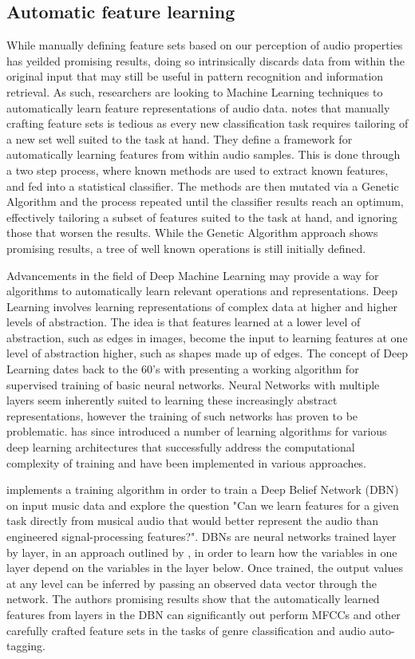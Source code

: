 \documentclass[twoside]{article}
\begin{document}
\begin{multicols}{2}
\section{Automatic feature learning}
While manually defining feature sets based on our perception of audio properties has yeilded promising results, doing so intrinsically discards data from within the original input that may still be useful in pattern recognition and information retrieval. As such, researchers are looking to Machine Learning techniques to automatically learn feature representations of audio data.  \citet{mierswa2005automatic} notes that manually crafting feature sets is tedious as every new classification task requires tailoring of a new set well suited to the task at hand. They define a framework for automatically learning features from within audio samples. This is done through a two step process, where known methods are used to extract known features, and fed into a statistical classifier. The methods are then mutated via a Genetic Algorithm and the process repeated until the classifier results reach an optimum, effectively tailoring a subset of features suited to the task at hand, and ignoring those that worsen the results. While the Genetic Algorithm approach shows promising results, a tree of well known operations is still initially defined.

Advancements in the field of Deep Machine Learning may provide a way for algorithms to automatically learn relevant operations and representations. Deep Learning involves learning representations of complex data at higher and higher levels of abstraction. The idea is that features learned at a lower level of abstraction, such as edges in images, become the input to learning features at one level of abstraction higher, such as shapes made up of edges. The concept of Deep Learning dates back to the 60's with \citet{ivakhnenko1965cybernetic} presenting a working algorithm for supervised training of basic neural networks. Neural Networks with multiple layers seem inherently suited to learning these increasingly abstract representations, however the training of such networks has proven to be problematic. \citet{bengio2009learning} has since introduced a number of learning algorithms for various deep learning architectures that successfully address the computational complexity of training and have been implemented in various approaches.

\citet{hamel2010learning} implements a training algorithm in order to train a Deep Belief Network (DBN) on input music data and explore the question "Can we learn features for a given task directly from musical audio that would better represent the audio than engineered signal-processing features?". DBNs are neural networks trained layer by layer, in an approach outlined by \citet{hinton2006fast}, in order to learn how the variables in one layer depend on the variables in the layer below. Once trained, the output values at any level can be inferred by passing an observed data vector through the network. The authors promising results show that the automatically learned features from layers in the DBN can significantly out perform MFCCs and other carefully crafted feature sets in the tasks of genre classification and audio auto-tagging.


\end{multicols}
\end{document}
